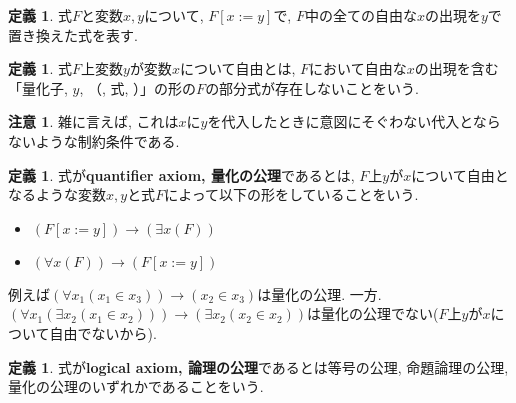 \documentclass[a4paper]{bxjsarticle}
\theoremstyle{definition}
\newtheorem{defn}[thm]{定義}
\newtheorem{rem}[thm]{注意}
\begin{document}
    \begin{defn}
        式$F$と変数$x, y$について, $F[x := y]$で, $F$中の全ての自由な$x$の出現を$y$で置き換えた式を表す.
    \end{defn}
    \begin{defn}
        式$F$上変数$y$が変数$x$について自由とは, $F$において自由な$x$の出現を含む「量化子, $y$, （, 式, ）」の形の$F$の部分式が存在しないことをいう.
    \end{defn}
    \begin{rem}
        雑に言えば, これは$x$に$y$を代入したときに意図にそぐわない代入とならないような制約条件である.
    \end{rem}
    \begin{defn}
        式が\textbf{quantifier axiom, 量化の公理}であるとは, $F$上$y$が$x$について自由となるような変数$x,y$と式$F$によって以下の形をしていることをいう.
        \begin{itemize}
            \item $(F[x := y]) \to (\exists x (F))$
            \item $(\forall x (F)) \to (F[x := y])$
        \end{itemize}
        
        例えば$(\forall x_1 (x_1 \in x_3)) \to (x_2 \in x_3)$は量化の公理. 一方. $(\forall x_1 (\exists x_2 (x_1 \in x_2))) \to (\exists x_2 (x_2 \in x_2))$は量化の公理でない($F$上$y$が$x$について自由でないから).
    \end{defn}
    \begin{defn}
        式が\textbf{logical axiom, 論理の公理}であるとは等号の公理, 命題論理の公理, 量化の公理のいずれかであることをいう.
    \end{defn}
    
    
    
    
    
\end{document}
